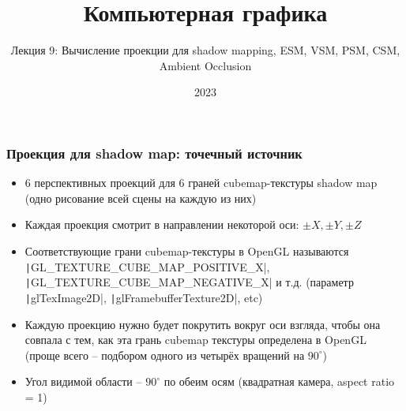 \documentclass[10pt]{beamer}
\title{Компьютерная графика}
\subtitle{Лекция 9: Вычисление проекции для shadow mapping, ESM, VSM, PSM, CSM, Ambient Occlusion}
\date{2023}
\begin{document}

\frame{\titlepage}

\begin{frame}[fragile]
\frametitle{Проекция для shadow map: точечный источник}
\begin{itemize}
\item 6 перспективных проекций для 6 граней cubemap-текстуры shadow map (одно рисование всей сцены на каждую из них)
\pause
\item Каждая проекция смотрит в направлении некоторой оси: \begin{math}\pm X, \pm Y, \pm Z\end{math}
\pause
\item Соответствующие грани cubemap-текстуры в OpenGL называются \texttt|GL_TEXTURE_CUBE_MAP_POSITIVE_X|, \texttt|GL_TEXTURE_CUBE_MAP_NEGATIVE_X| и т.д. (параметр \texttt|glTexImage2D|, \texttt|glFramebufferTexture2D|, etc)
\pause
\item Каждую проекцию нужно будет покрутить вокруг оси взгляда, чтобы она совпала с тем, как эта грань cubemap текстуры определена в OpenGL (проще всего -- подбором одного из четырёх вращений на \begin{math}90^\circ\end{math})
\pause
\item Угол видимой области -- \begin{math}90^\circ\end{math} по обеим осям (квадратная камера, aspect ratio = 1)
\end{itemize}
\end{frame}
\end{document}
